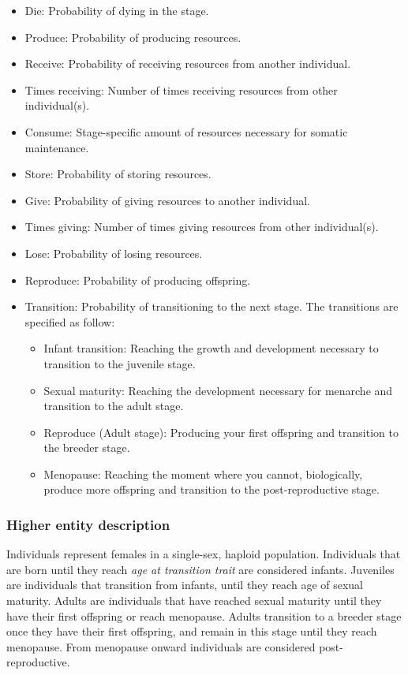 \documentclass{article}
\begin{document}
\begin{itemize}
    \item Die: Probability of dying in the stage.
    \item Produce: Probability of producing resources.
    \item Receive: Probability of receiving resources from another individual.
    \item Times receiving: Number of times receiving resources from other individual(s).
    \item Consume: Stage-specific amount of resources necessary for somatic maintenance.
    \item Store: Probability of storing resources.
    \item Give: Probability of giving resources to another individual.
    \item Times giving: Number of times giving resources from other individual(s).
    \item Lose: Probability of losing resources.
    \item Reproduce: Probability of producing offspring.
    \item Transition: Probability of transitioning to the next stage. The transitions are specified as follow:
    \begin{itemize}
        \item Infant transition: Reaching the growth and development necessary to transition to the juvenile stage.
        \item Sexual maturity: Reaching the development necessary for menarche and transition to the adult stage.
        \item Reproduce (Adult stage): Producing your first offspring and transition to the breeder stage.
        \item Menopause: Reaching the moment where you cannot, biologically, produce more offspring and transition to the post-reproductive stage.
    \end{itemize}
\end{itemize}

\subsubsection{Higher entity description}

Individuals represent females in a single-sex, haploid population. Individuals that are born until they reach \emph{age at transition trait} are considered infants. Juveniles are individuals that transition from infants, until they reach age of sexual maturity. Adults are individuals that have reached sexual maturity until they have their first offspring or reach menopause. Adults transition to a breeder stage once they have their first offspring, and remain in this stage until they reach menopause. From menopause onward individuals are considered post-reproductive.
\end{document}
